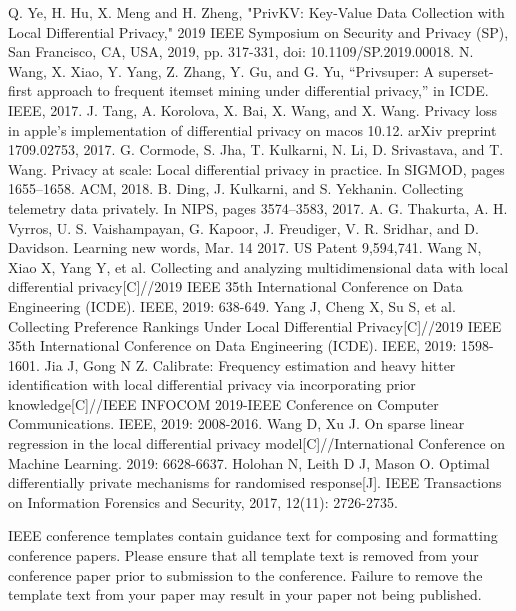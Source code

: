 \documentclass[conference]{IEEEtran}
\begin{document}
\begin{thebibliography}{00}
 Q. Ye, H. Hu, X. Meng and H. Zheng, "PrivKV: Key-Value Data Collection with Local Differential Privacy," 2019 IEEE Symposium on Security and Privacy (SP), San Francisco, CA, USA, 2019, pp. 317-331, doi: 10.1109/SP.2019.00018.
 N. Wang, X. Xiao, Y. Yang, Z. Zhang, Y. Gu, and G. Yu, “Privsuper:
A superset-first approach to frequent itemset mining under differential privacy,” in ICDE. IEEE, 2017.
 J. Tang, A. Korolova, X. Bai, X. Wang, and X. Wang. Privacy loss in
apple’s implementation of differential privacy on macos 10.12. arXiv preprint 1709.02753, 2017.
 G. Cormode, S. Jha, T. Kulkarni, N. Li, D. Srivastava, and T. Wang.
Privacy at scale: Local differential privacy in practice. In SIGMOD, pages 1655–1658. ACM, 2018.
 B. Ding, J. Kulkarni, and S. Yekhanin. Collecting telemetry data privately. In NIPS, pages 3574–3583, 2017.
 A. G. Thakurta, A. H. Vyrros, U. S. Vaishampayan, G. Kapoor, J. Freudiger, V. R.
Sridhar, and D. Davidson. Learning new words, Mar. 14 2017. US Patent 9,594,741.
 Wang N, Xiao X, Yang Y, et al. Collecting and analyzing multidimensional data with local differential privacy[C]//2019 IEEE 35th International Conference on Data Engineering (ICDE). IEEE, 2019: 638-649.
 Yang J, Cheng X, Su S, et al. Collecting Preference Rankings Under Local Differential Privacy[C]//2019 IEEE 35th International Conference on Data Engineering (ICDE). IEEE, 2019: 1598-1601.
 Jia J, Gong N Z. Calibrate: Frequency estimation and heavy hitter identification with local differential privacy via incorporating prior knowledge[C]//IEEE INFOCOM 2019-IEEE Conference on Computer Communications. IEEE, 2019: 2008-2016.
 Wang D, Xu J. On sparse linear regression in the local differential privacy model[C]//International Conference on Machine Learning. 2019: 6628-6637.
 Holohan N, Leith D J, Mason O. Optimal differentially private mechanisms for randomised response[J]. IEEE Transactions on Information Forensics and Security, 2017, 12(11): 2726-2735.


\end{thebibliography}
\vspace{12pt}
\color{red}
IEEE conference templates contain guidance text for composing and formatting conference papers. Please ensure that all template text is removed from your conference paper prior to submission to the conference. Failure to remove the template text from your paper may result in your paper not being published.
\end{document}
